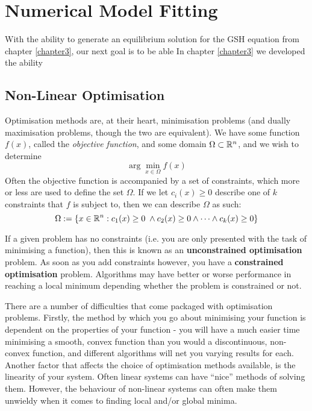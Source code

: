
\chapter{Numerical Model Fitting}
\label{chapter4}

With the ability to generate an equilibrium solution for the GSH equation from chapter \ref{chapter3}, 
our next goal is to be able 
\todo
In chapter \ref{chapter3} we developed the ability 

\section{Non-Linear Optimisation}

Optimisation methods are, at their heart, minimisation problems (and dually maximisation problems, 
though the two are equivalent). We have some function $f(x)$, called the \textit{objective function},
and some domain $\Omega \subset \mathbb{R}^n$, and we wish to determine
$$\arg\min_{x \in \Omega} f(x)$$
Often the objective function is accompanied by a set of constraints, which more or 
less are used to define the set $\Omega$. If we let $c_i(x) \ge 0$ describe one of $k$ constraints that $f$ 
is subject to, then we can describe $\Omega$ as such:
$$\Omega := \lbrace x \in \mathbb{R}^n : c_1(x) \ge 0 \; \land c_2(x) \ge 0 \land \dots \land c_k(x) \ge 0 \rbrace$$

\begin{remark}
    If a given problem has no constraints (i.e. you are only presented with the task of minimising a function), then 
    this is known as an \textbf{unconstrained optimisation} problem. As soon as you add constraints however, you have a 
    \textbf{constrained optimisation} problem. Algorithms may have better or worse performance in reaching a local minimum 
    depending whether the problem is constrained or not.
\end{remark}

There are a number of difficulties that come packaged with optimisation problems. Firstly, 
the method by which you go about minimising your function is dependent on the properties of your function 
- you will have a much easier time minimising a smooth, convex function than you would a discontinuous, 
non-convex function, and different algorithms will net you varying results for each. Another factor 
that affects the choice of optimisation methods available, is the linearity of your system. Often linear systems 
can have ``nice'' methods of solving them. However, the behaviour of non-linear systems can often make them 
unwieldy when it comes to finding local and/or global minima. 

